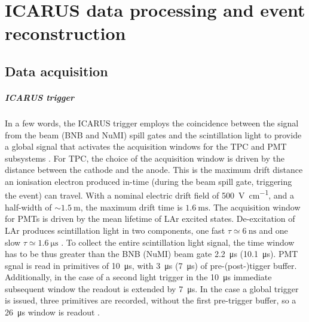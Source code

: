 
\chapter{ICARUS data processing and event reconstruction}
\label{chap:event_reconstruction}




\section{Data acquisition} \label{sec:DAQ}


\paragraph{ICARUS trigger} In a few words, the ICARUS trigger employs the coincidence between the signal from the beam (BNB and NuMI) spill gates and the scintillation light to provide a global signal that activates  the acquisition windows for the TPC and PMT subsystems \cite{ICARUS:2025kai}. For TPC, the choice of the acquisition window is driven by the distance between the cathode and the anode. This is the maximum drift distance an ionisation electron produced in-time (during the beam spill gate, triggering the event) can travel. With a nominal electric drift field of \SI{500}{\volt\per\cm}, and a half-width of $\sim\SI{1.5}{\m}$, the maximum drift time is $\SI{1.6}{\ms}$. The acquisition window for PMTs is driven by the mean lifetime of LAr excited states. De-excitation of LAr produces scintillation light in two components, one fast $\tau\simeq \SI{6}{\ns}$ and one slow $\tau\simeq\SI{1.6}{\us}$ \cite{Segreto:2020qks}. To collect the entire scintillation light signal, the time window has to be thus greater than the BNB (NuMI) beam gate \SI{2.2}{\us} (\SI{10.1}{\us}). PMT sgnal is read in primitives of \SI{10}{\us}, with \SI{3}{\us} (\SI{7}{\us}) of pre-(post-)tigger buffer.  Additionally, in the case of a second light trigger in the \SI{10}{\us} immediate subsequent window the readout is extended by \SI{7}{\us}. In the case a global trigger is issued, three primitives are recorded, without the first pre-trigger buffer, so a \SI{26}{\us} window is readout \cite{ICARUS:2025kai}. 

